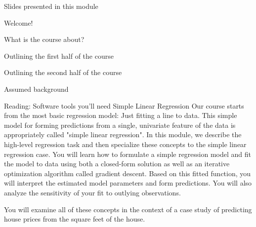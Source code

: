 \item Slides presented in this module
\item Welcome!
\item What is the course about?
\item Outlining the first half of the course
\item Outlining the second half of the course
\item Assumed background
\item Reading: Software tools you'll need
Simple Linear Regression
Our course starts from the most basic regression model: Just fitting a line to data. This simple model for forming predictions from a single, univariate feature of the data is appropriately called "simple linear regression".
In this module, we describe the high-level regression task and then specialize these concepts to the simple linear regression case. You will learn how to formulate a simple regression model and fit the model to data using both a closed-form solution as well as an iterative optimization algorithm called gradient descent. Based on this fitted function, you will interpret the estimated model parameters and form predictions. You will also analyze the sensitivity of your fit to outlying observations.

You will examine all of these concepts in the context of a case study of predicting house prices from the square feet of the house.

